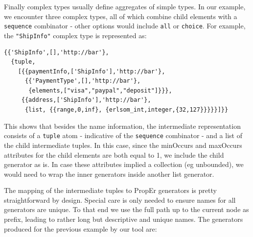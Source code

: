 \documentclass[submission,copyright,a4]{eptcs}
\begin{document}
Finally complex types usually define aggregates of simple types. In
our example, we encounter three complex types, all of which combine
child elements with a \texttt{sequence} combinator - other options
would include \texttt{all} or \texttt{choice}. For example, the
\texttt{"ShipInfo"} complex type is represented as:

\begin{lstlisting}
{{'ShipInfo',[],'http://bar'},
  {tuple,
    [{{paymentInfo,['ShipInfo'],'http://bar'},
      {{'PaymentType',[],'http://bar'},
       {elements,["visa","paypal","deposit"]}}},
     {{address,['ShipInfo'],'http://bar'},
      {list, {{range,0,inf}, {erlsom_int,integer,{32,127}}}}}]}}
\end{lstlisting}

This shows that besides the name information, the intermediate representation consists of a 
\texttt{tuple} atom - indicative of the \texttt{sequence} combinator - and a list of the 
child intermediate tuples. In this case, since the minOccurs and maxOccurs attributes for 
the child elements are both equal to 1, we include the child generator as is. In case these
attributes implied a collection (eg unbounded), we would need to wrap the inner generators 
inside another list generator.


The mapping of the intermediate tuples to PropEr generators is pretty straightforward by design. 
Special care is only needed to ensure names for all generators are unique. To that end we use 
the full path up to the current node as prefix, leading to rather long but descriptive and unique 
names. The generators produced for the previous example by our tool are:
\end{document}
